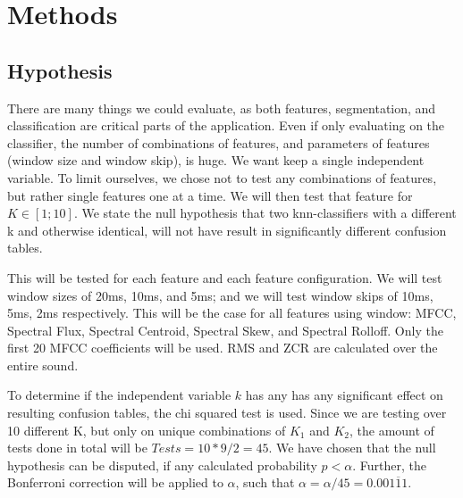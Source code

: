 
\section{Methods}
	\subsection{Hypothesis}
		There are many things we could evaluate, as both features, segmentation, and classification are critical parts of the application. Even if only evaluating on the classifier, the number of combinations of features, and parameters of features (window size and window skip), is huge. We want keep a single independent variable. To limit ourselves, we chose not to test any combinations of features, but rather single features one at a time. We will then test that feature for $K \in [1;10]$. We state the null hypothesis that two knn-classifiers with a different k and otherwise identical, will not have result in significantly different confusion tables.
		
		This will be tested for each feature and each feature configuration.
		We will test window sizes of 20ms, 10ms, and 5ms; and we will test window skips of 10ms, 5ms, 2ms respectively. This will be the case for all features using window: MFCC, Spectral Flux, Spectral Centroid, Spectral Skew, and Spectral Rolloff. Only the first 20 MFCC coefficients will be used. RMS and ZCR are calculated over the entire sound.
		
		To determine if the independent variable $k$ has any has any significant effect on resulting confusion tables, the chi squared test is used. Since we are testing over 10 different K, but only on unique combinations of $K_1$ and $K_2$, the amount of tests done in total will be $Tests = 10*9/2 = 45$. We have chosen that the null hypothesis can be disputed, if any calculated probability $p < \alpha$. Further, the Bonferroni correction\citep{bonferroni} will be applied to $\alpha$, such that $\alpha=\alpha/45 = 0.00\overline{111}$.
		
